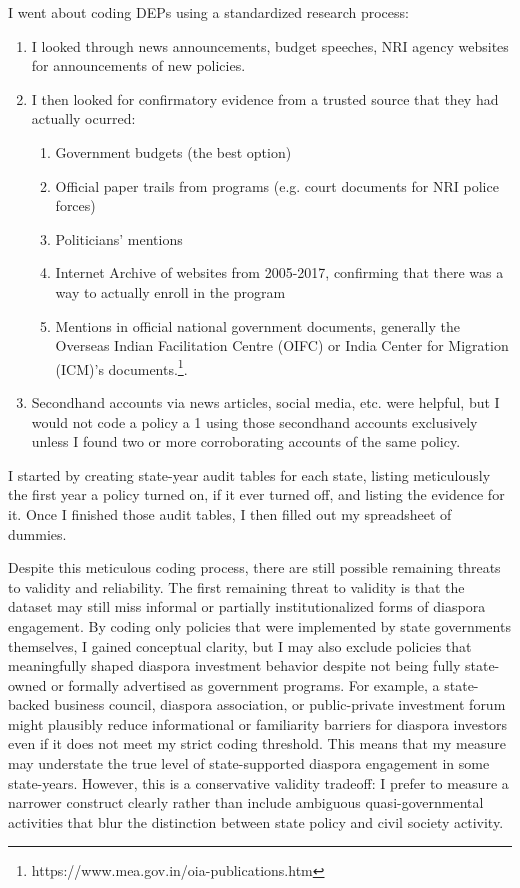 \documentclass[doublespace,nopageskip]{UVAthesis}
\begin{document}
            I went about coding DEPs using a standardized research process:
            \begin{enumerate}
                \item I looked through news announcements, budget speeches, NRI agency websites for announcements of new policies.
                \item I then looked for confirmatory evidence from a trusted source that they had actually ocurred:
                \begin{enumerate}
                    \item Government budgets (the best option)
                    \item Official paper trails from programs (e.g. court documents for NRI police forces)
                    \item Politicians' mentions
                    \item Internet Archive of websites from 2005-2017, confirming that there was a way to actually enroll in the program
                    \item Mentions in official national government documents, generally the Overseas Indian Facilitation Centre (OIFC) or India Center for Migration (ICM)'s documents.\footnote{https://www.mea.gov.in/oia-publications.htm}.
                \end{enumerate}
            \item Secondhand accounts via news articles, social media, etc. were helpful, but I would not code a policy a 1 using those secondhand accounts exclusively unless I found two or more corroborating accounts of the same policy.
            \end{enumerate}

I started by creating state-year audit tables for each state, listing meticulously the first year a policy turned on, if it ever turned off, and listing the evidence for it. Once I finished those audit tables, I then filled out my spreadsheet of dummies.

Despite this meticulous coding process, there are still possible remaining threats to validity and reliability. The first remaining threat to validity is that the dataset may still miss informal or partially institutionalized forms of diaspora engagement. By coding only policies that were implemented by state governments themselves, I gained conceptual clarity, but I may also exclude policies that meaningfully shaped diaspora investment behavior despite not being fully state-owned or formally advertised as government programs. For example, a state-backed business council, diaspora association, or public-private investment forum might plausibly reduce informational or familiarity barriers for diaspora investors even if it does not meet my strict coding threshold. This means that my measure may understate the true level of state-supported diaspora engagement in some state-years. However, this is a conservative validity tradeoff: I prefer to measure a narrower construct clearly rather than include ambiguous quasi-governmental activities that blur the distinction between state policy and civil society activity.
\end{document}
